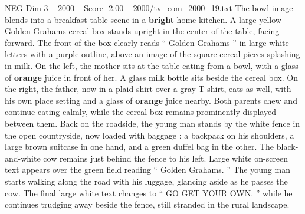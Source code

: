 \begin{textsample}{NEG Dim 3 – 2000 – Score -2.00 – 2000/tv\_com\_2000\_19.txt}
The bowl image blends into a breakfast table scene in a \textbf{bright} home kitchen.
A large yellow Golden Grahams cereal box stands upright in the center of the table, facing forward.
The front of the box clearly reads “ Golden Grahams ” in large white letters with a purple outline, above an image of the square cereal pieces splashing in milk.
On the left, the mother sits at the table eating from a bowl, with a glass of \textbf{orange} juice in front of her.
A glass milk bottle sits beside the cereal box.
On the right, the father, now in a plaid shirt over a gray T-shirt, eats as well, with his own place setting and a glass of \textbf{orange} juice nearby.
Both parents chew and continue eating calmly, while the cereal box remains prominently displayed between them.
Back on the roadside, the young man stands by the white fence in the open countryside, now loaded with baggage : a backpack on his shoulders, a large brown suitcase in one hand, and a green duffel bag in the other.
The black-and-white cow remains just behind the fence to his left.
Large white on-screen text appears over the green field reading “ Golden Grahams. ” The young man starts walking along the road with his luggage, glancing aside as he passes the cow.
The final large white text changes to “ GO GET YOUR OWN. ” while he continues trudging away beside the fence, still stranded in the rural landscape.

\end{textsample}
